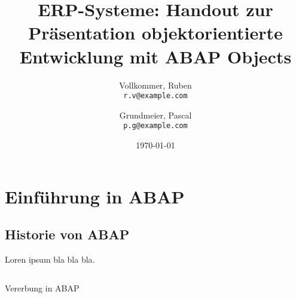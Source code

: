 \documentclass[12pt,a4paper]{scrartcl}
\begin{document}
\title{ERP-Systeme: Handout zur Präsentation objektorientierte Entwicklung mit ABAP Objects}

\author{
  Vollkommer, Ruben\\
  \texttt{r.v@example.com}
  \and
  Grundmeier, Pascal\\
  \texttt{p.g@example.com}
}


\date{\today}
\maketitle

\newpage
\tableofcontents

\renewcommand\listoflistingscaption{Liste des enthaltenen Quellcodes}
\listoflistings

\newpage

\section{Einführung in ABAP}
\subsection{Historie von ABAP}
Loren ipsum bla bla bla.

\begin{listing}
  \inputminted{abap}{code/vererbung.abap}
  \caption{Vererbung in ABAP}
  \label{listing:abap_vererbung}
\end{listing}
\end{document}
